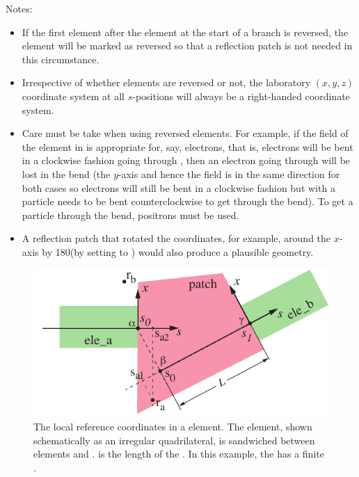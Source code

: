 Notes:
\begin{itemize}
\item
If the first element after the  element at the start of a branch is reversed, the
 element will be marked as reversed so that a reflection patch is not needed in
this circumstance.
\item
Irrespective of whether elements are reversed or not, the laboratory $(x,y,z)$ coordinate system
at all $s$-positions will always be a right-handed coordinate system.
\item
Care must be take when using reversed elements. For example, if the field of the  element in
 is appropriate for, say, electrons, that is, electrons will be bent in a clockwise
fashion going through , then an electron going through  will be lost in the bend
(the $y$-axis and hence the field is in the same direction for both cases so electrons will still be
bent in a clockwise fashion but with  a particle needs to be bent counterclockwise to get
through the bend). To get a particle through the bend, positrons must be used.
\item
A reflection patch that rotated the coordinates, for example, around the $x$-axis by 180\Deg (by
setting  to ) would also produce a plausible geometry.
\end{itemize}


\begin{figure}[bt]
  \centering
  \includegraphics[width=5in]{patch-problem.pdf}
  \caption[The local reference coordinates in a  element.]
{The local reference coordinates in a  element. The  element, shown
schematically as an irregular quadrilateral, is sandwiched between elements  and
.  is the length of the . In this example, the  has a finite
.}
  \label{f:patch.prob}
\end{figure}


